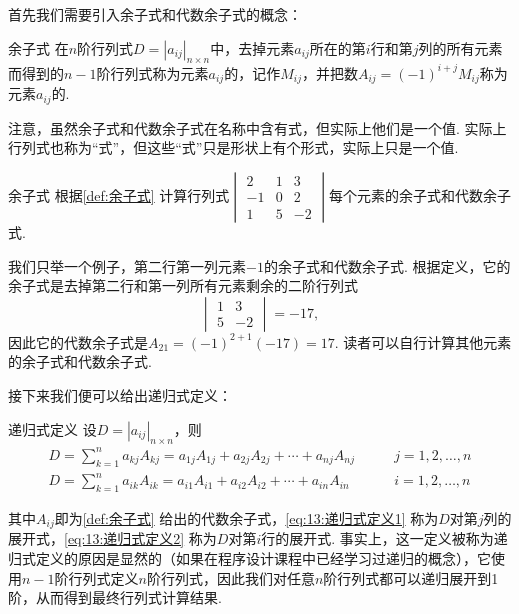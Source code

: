 首先我们需要引入余子式和代数余子式的概念：
\begin{definition}{}{余子式}
    在$n$阶行列式$D=|a_{ij}|_{n \times n}$中，去掉元素$a_{ij}$所在的第$i$行和第$j$列的所有元素而得到的$n-1$阶行列式称为元素$a_{ij}$的，记作$M_{ij}$，并把数$A_{ij}=(-1)^{i+j}M_{ij}$称为元素$a_{ij}$的.
\end{definition}
注意，虽然余子式和代数余子式在名称中含有式，但实际上他们是一个值. 实际上行列式也称为``式''，但这些``式''只是形状上有个形式，实际上只是一个值.
\begin{example}{}{余子式}
    根据\autoref{def:余子式} 计算行列式$\begin{vmatrix}
            2  & 1 & 3  \\
            -1 & 0 & 2  \\
            1  & 5 & -2
        \end{vmatrix}$每个元素的余子式和代数余子式.
\end{example}

\begin{solution}
    我们只举一个例子，第二行第一列元素$-1$的余子式和代数余子式. 根据定义，它的余子式是去掉第二行和第一列所有元素剩余的二阶行列式
    \[\begin{vmatrix}
            1 & 3  \\
            5 & -2
        \end{vmatrix}=-17,\]
    因此它的代数余子式是$A_{21}=(-1)^{2+1}(-17)=17$. 读者可以自行计算其他元素的余子式和代数余子式.
\end{solution}

接下来我们便可以给出递归式定义：
\begin{definition}{}{递归式定义}
    设$D=|a_{ij}|_{n \times n}$，则
    \begin{align}
        \label{eq:13:递归式定义1}
        D=\sum_{k=1}^{n}a_{kj}A_{kj}=a_{1j}A_{1j}+a_{2j}A_{2j}+\cdots+a_{nj}A_{nj} & \qquad j=1,2,\ldots,n \\
        \label{eq:13:递归式定义2}
        D=\sum_{k=1}^{n}a_{ik}A_{ik}=a_{i1}A_{i1}+a_{i2}A_{i2}+\cdots+a_{in}A_{in} & \qquad i=1,2,\ldots,n
    \end{align}
\end{definition}
其中$A_{ij}$即为\autoref{def:余子式} 给出的代数余子式，\autoref{eq:13:递归式定义1} 称为$D$对第$j$列的展开式，\autoref{eq:13:递归式定义2} 称为$D$对第$i$行的展开式. 事实上，这一定义被称为递归式定义的原因是显然的（如果在程序设计课程中已经学习过递归的概念），它使用$n-1$阶行列式定义$n$阶行列式，因此我们对任意$n$阶行列式都可以递归展开到1阶，从而得到最终行列式计算结果.

